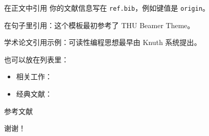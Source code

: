 \documentclass[11pt,aspectratio=169]{beamer}
\begin{document}
\begin{frame}{在正文中引用}
    你的文献信息写在 \texttt{ref.bib}，例如键值是 \texttt{origin}。

    \vspace{0.6em}
    在句子里引用：这个模板最初参考了 THU Beamer Theme\cite{origin}。

    \vspace{0.4em}
    学术论文引用示例：可读性编程思想最早由 Knuth 系统提出\cite{knuth1984}。

    \vspace{0.6em}
    也可以放在列表里：
    \begin{itemize}
        \item 相关工作：\cite{origin}
        \item 经典文献：\cite{knuth1984}
    \end{itemize}
\end{frame}

\begin{frame}[allowframebreaks]{参考文献}
    
    
\end{frame}

\begin{frame}
    \centering
    \Large 谢谢！
\end{frame}
\end{document}
